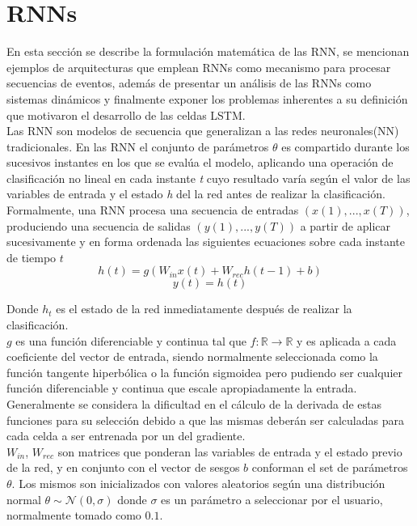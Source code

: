 \documentclass{article}
\begin{document}
	\section{RNNs}\label{sectionRNN}
	En esta sección se describe la formulación matemática de las RNN, se mencionan ejemplos de arquitecturas que emplean RNNs como mecanismo para procesar secuencias de eventos, además de presentar un análisis de las RNNs como sistemas dinámicos y finalmente exponer los problemas inherentes a su definición que motivaron el desarrollo de las celdas LSTM.\\
	Las RNN son modelos de secuencia que generalizan a las redes neuronales(NN) tradicionales\cite{19IntroductionRNN}. En las RNN el conjunto de parámetros $\theta$ es compartido durante los sucesivos instantes en los que se evalúa el modelo, aplicando una operación de clasificación no lineal en cada instante \textit{t} cuyo resultado varía según el valor de las variables de entrada y el estado \textit{h} del la red antes de realizar la clasificación.\\ 
	
	Formalmente, una RNN procesa una secuencia de entradas \textit{$(x(1) , ... , x(T))$}, produciendo una secuencia de salidas \textit{ $(y(1), ... , y(T))$} a partir de aplicar sucesivamente y en forma ordenada las siguientes ecuaciones sobre cada instante de tiempo $t$ 
	\begin{equation}\label{RNN}
	h(t) = g( W_{in} x(t) + W_{rec} h(t-1) + b )
	\end{equation}
	\begin{equation*}
	y(t) = h(t)
	\end{equation*}
	
	Donde $h_{t}$ es el estado de la red inmediatamente después de realizar la clasificación. \\
	$g$ es una función diferenciable y continua tal que $f: \mathbb{R} \rightarrow \mathbb{R}$ y es aplicada a cada coeficiente del vector de entrada, siendo normalmente seleccionada como la función tangente hiperbólica o la función sigmoidea pero pudiendo ser cualquier función diferenciable y continua que escale apropiadamente la entrada. \\
	Generalmente se considera la dificultad en el cálculo de la derivada de estas funciones para su selección debido a que las mismas deberán ser calculadas para cada celda a ser entrenada por un del gradiente.\\
	$W_{in}$, $W_{rec}$ son matrices que ponderan las variables de entrada y el estado previo de la red, y en conjunto con el vector de sesgos $b$ conforman el set de parámetros $\theta$. Los mismos son inicializados con valores aleatorios según una distribución normal $\theta \sim \mathcal{N}(0,\sigma)$ donde $\sigma$ es un parámetro a seleccionar por el usuario, normalmente tomado como $0.1$.\\
	
\end{document}
